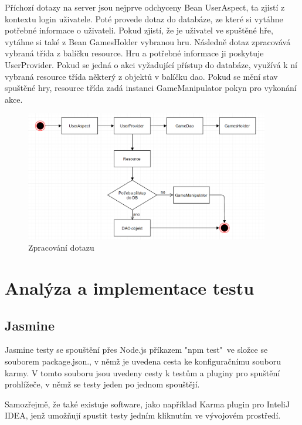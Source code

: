 \documentclass[czech,master,public,dept460,male,cpdeclaration,twoside]{diploma}
\begin{document}
Příchozí dotazy na server jsou nejprve odchyceny Bean UserAspect, ta zjistí z kontextu login uživatele. Poté provede dotaz do databáze, ze které si vytáhne potřebné informace o uživateli. Pokud zjistí, že je uživatel ve spuštěné hře, vytáhne si také z Bean GamesHolder vybranou hru. Následně dotaz zpracovává vybraná třída z balíčku resource. Hru a potřebné informace ji poskytuje UserProvider. Pokud se jedná o akci vyžadující přístup do databáze, využívá k ní vybraná resource třída některý z objektů v balíčku dao. Pokud se mění stav spuštěné hry, resource třída zadá instanci GameManipulator pokyn pro vykonání akce.

\begin{figure}[H]
\centering\includegraphics[width=0.95\textwidth]{Figures/RequestFlow.png}\caption{Zpracování dotazu}
\end{figure}

\section{Analýza a implementace testu}

\subsection{Jasmine}
Jasmine testy se spouštění přes Node.js příkazem "npm test"~ve složce se souborem package.json., v němž je uvedena cesta ke konfiguračnímu souboru karmy. V tomto souboru jsou uvedeny cesty k testům a pluginy pro spuštění prohlížeče, v němž se testy jeden po jednom spouštějí. 

Samozřejmě, že také existuje software, jako například Karma plugin pro InteliJ IDEA, jenž umožňují spustit testy jedním kliknutím ve vývojovém prostředí.
\end{document}
